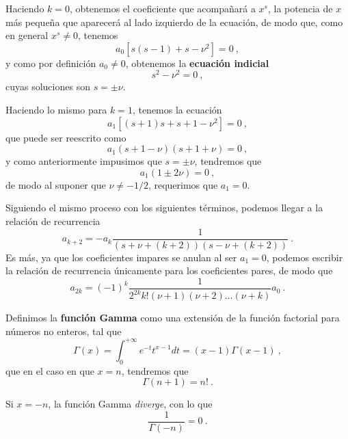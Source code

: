 Haciendo $k = 0$, obtenemos el coeficiente que acompañará a $x^s$, la potencia de $x$ más pequeña que aparecerá al lado izquierdo de la ecuación, de modo que, como en general $x^s \neq 0$, tenemos
\begin{equation}
    a_0 \left[ s(s-1) + s - \nu^2 \right] = 0 \ ,
\end{equation}
y como por definición $a_0 \neq 0$, obtenemos la \textbf{ecuación indicial}
\begin{equation}
    s^2 - \nu^2 = 0 \ ,
\end{equation}
cuyas soluciones son $s = \pm \nu$.

Haciendo lo mismo para $k = 1$, tenemos la ecuación
\begin{equation}
    a_1\left[ (s+1)s + s + 1 - \nu^2 \right] = 0 \ ,
\end{equation}
que puede ser reescrito como
\begin{equation}
    a_1(s + 1 - \nu)(s + 1 + \nu) = 0 \ ,
\end{equation}
y como anteriormente impusimos que $s=\pm \nu$, tendremos que
\begin{equation}
    a_1 (1 \pm 2\nu) = 0 \ ,
\end{equation}
de modo al suponer que $\nu \neq -1/2$, requerimos que $a_1 = 0$.

Siguiendo el mismo proceso con los siguientes términos, podemos llegar a la relación de recurrencia
\begin{equation}
    a_{k + 2} = -a_k \frac{1}{(s+\nu+(k+2))(s-\nu+(k+2))} \ .
\end{equation} 
Es más, ya que los coeficientes impares se anulan al ser $a_1 = 0$, podemos escribir la relación de recurrencia únicamente para los coeficientes pares, de modo que
\begin{equation} \label{eq:recurrencia_Bessel}
    a_{2k} = (-1)^k \frac{1}{2^{2k} k! (\nu + 1) (\nu + 2) \dots (\nu + k)}a_0 \ .
\end{equation}

\begin{defi} 
    Definimos la \textbf{función Gamma} como una extensión de la función factorial para números no enteros, tal que
    \begin{equation}
        \Gamma(x) = \int_0^{+\infty} e^{-t} t^{x-1} dt = (x-1) \Gamma(x-1)\ ,
    \end{equation}
    que en el caso en que $x=n$, tendremos que
    \begin{equation}
        \Gamma(n+1) = n! \ .
    \end{equation}

    Si $x = -n$, la función Gamma \emph{diverge}, con lo que
    \begin{equation}
        \frac{1}{\Gamma(-n)} = 0 \ .
    \end{equation}
\end{defi}

